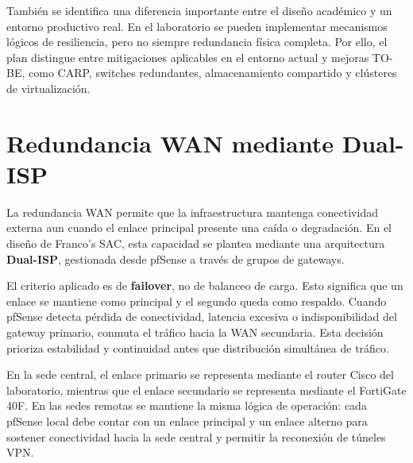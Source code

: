 \documentclass[11pt, a4paper, oneside]{report}
\begin{document}
También se identifica una diferencia importante entre el diseño académico y un entorno productivo real. En el laboratorio se pueden implementar mecanismos lógicos de resiliencia, pero no siempre redundancia física completa. Por ello, el plan distingue entre mitigaciones aplicables en el entorno actual y mejoras TO-BE, como CARP, switches redundantes, almacenamiento compartido y clústeres de virtualización.

\section{Redundancia WAN mediante Dual-ISP}

La redundancia WAN permite que la infraestructura mantenga conectividad externa aun cuando el enlace principal presente una caída o degradación. En el diseño de Franco's SAC, esta capacidad se plantea mediante una arquitectura \textbf{Dual-ISP}, gestionada desde pfSense a través de grupos de gateways.

El criterio aplicado es de \textbf{failover}, no de balanceo de carga. Esto significa que un enlace se mantiene como principal y el segundo queda como respaldo. Cuando pfSense detecta pérdida de conectividad, latencia excesiva o indisponibilidad del gateway primario, conmuta el tráfico hacia la WAN secundaria. Esta decisión prioriza estabilidad y continuidad antes que distribución simultánea de tráfico.

En la sede central, el enlace primario se representa mediante el router Cisco del laboratorio, mientras que el enlace secundario se representa mediante el FortiGate 40F. En las sedes remotas se mantiene la misma lógica de operación: cada pfSense local debe contar con un enlace principal y un enlace alterno para sostener conectividad hacia la sede central y permitir la reconexión de túneles VPN.

\renewcommand{\arraystretch}{1.3}
\footnotesize
{}
\end{document}
